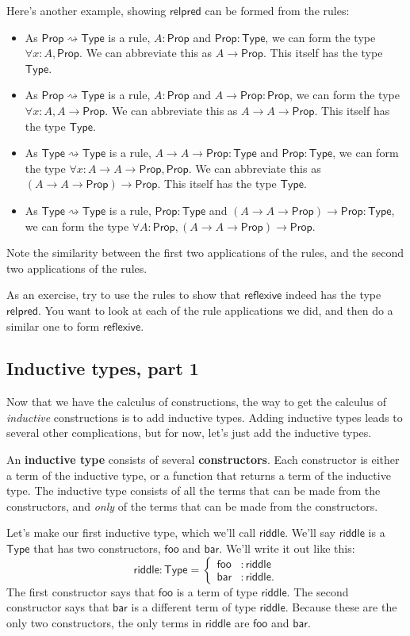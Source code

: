 \documentclass[11pt,paper=letter]{scrartcl}
\renewcommand{\sf}{\mathsf}
\newcommand{\prop}{\mathsf{Prop}}
\newcommand{\type}{\mathsf{Type}}
\newcommand{\toto}{\rightsquigarrow}
\begin{document}
Here's another example, showing $\sf{relpred}$ can be formed from the rules:
\begin{itemize}
\item As $\prop \toto \type$ is a rule, $A: \prop$ and $\prop: \type$, we can form the type $\forall x: A, \prop$. We can abbreviate this as $A \to \prop$. This itself has the type $\type$.
\item As $\prop \toto \type$ is a rule, $A: \prop$ and $A \to \prop: \prop$, we can form the type $\forall x: A, A \to \prop$. We can abbreviate this as $A \to A \to \prop$. This itself has the type $\type$.
\item As $\type \toto \type$ is a rule, $A \to A \to \prop : \type$ and $\prop: \type$, we can form the type $\forall x: A \to A \to \prop, \prop$. We can abbreviate this as $(A \to A \to \prop) \to \prop$. This itself has the type $\type$.
\item As $\type \toto \type$ is a rule, $\prop: \type$ and $(A \to A \to \prop) \to \prop: \type$, we can form the type $\forall A: \prop, (A \to A \to \prop) \to \prop$.
\end{itemize}
Note the similarity between the first two applications of the rules, and the second two applications of the rules.

As an exercise, try to use the rules to show that $\sf{reflexive}$ indeed has the type $\sf{relpred}$. You want to look at each of the rule applications we did, and then do a similar one to form $\sf{reflexive}$.

\subsection{Inductive types, part 1}

Now that we have the calculus of constructions, the way to get the calculus of \emph{inductive} constructions is to add inductive types. Adding inductive types leads to several other complications, but for now, let's just add the inductive types.

An \textbf{inductive type} consists of several \textbf{constructors}. Each constructor is either a term of the inductive type, or a function that returns a term of the inductive type. The inductive type consists of all the terms that can be made from the constructors, and \emph{only} of the terms that can be made from the constructors.

Let's make our first inductive type, which we'll call $\sf{riddle}$. We'll say $\sf{riddle}$ is a $\type$ that has two constructors, $\sf{foo}$ and $\sf{bar}$. We'll write it out like this: \[
  \sf{riddle} : \type = \begin{cases}
    \sf{foo}&: \sf{riddle} \\
    \sf{bar}&: \sf{riddle}.
  \end{cases}
\]
The first constructor says that $\sf{foo}$ is a term of type $\sf{riddle}$. The second constructor says that $\sf{bar}$ is a different term of type $\sf{riddle}$. Because these are the only two constructors, the only terms in $\sf{riddle}$ are $\sf{foo}$ and $\sf{bar}$.
\end{document}
